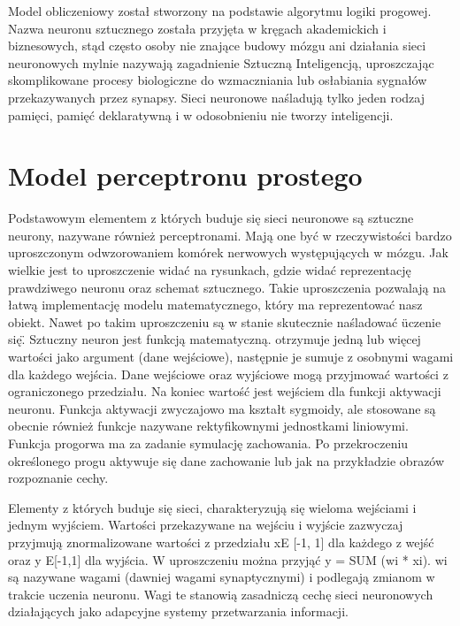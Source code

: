 \documentclass[12pt,a4paper,twoside,titlepage,openright]{book}
\begin{document}
Model obliczeniowy został stworzony na podstawie algorytmu logiki progowej. 
Nazwa neuronu sztucznego została przyjęta w kręgach akademickich i biznesowych, stąd często osoby nie znające budowy mózgu ani działania sieci neuronowych mylnie nazywają zagadnienie Sztuczną Inteligencją, uproszczając skomplikowane procesy biologiczne do wzmaczniania lub osłabiania sygnałów przekazywanych przez synapsy. Sieci neuronowe naśladują tylko jeden rodzaj pamięci, pamięć deklaratywną i w odosobnieniu nie tworzy inteligencji.


\section{Model perceptronu prostego}
Podstawowym elementem z których buduje się sieci neuronowe są sztuczne neurony, nazywane również perceptronami. Mają one być w rzeczywistości bardzo uproszczonym odwzorowaniem komórek nerwowych występujących w mózgu. Jak wielkie jest to uproszczenie widać na rysunkach, gdzie widać reprezentację prawdziwego neuronu  oraz schemat sztucznego. Takie uproszczenia pozwalają na łatwą implementację modelu matematycznego, który ma reprezentować nasz obiekt. Nawet po takim uproszczeniu są w stanie skutecznie naśladować \"uczenie się\". 
Sztuczny neuron jest funkcją matematyczną.  otrzymuje jedną lub więcej wartości jako argument (dane wejściowe), następnie je sumuje z osobnymi wagami dla każdego wejścia. Dane wejściowe oraz wyjściowe mogą przyjmować wartości z ograniczonego przedziału. Na koniec wartość jest wejściem dla funkcji aktywacji neuronu. Funkcja aktywacji zwyczajowo ma kształt sygmoidy, ale stosowane są obecnie również funkcje nazywane rektyfikownymi jednostkami liniowymi. Funkcja progorwa ma za zadanie symulację zachowania. Po przekroczeniu określonego progu aktywuje się dane zachowanie lub jak na przykładzie obrazów rozpoznanie cechy.

Elementy z których buduje się sieci, charakteryzują się wieloma wejściami i jednym wyjściem. Wartości przekazywane na wejściu i wyjście zazwyczaj przyjmują znormalizowane wartości z przedziału xE [-1, 1] dla każdego z wejść oraz y E[-1,1] dla wyjścia. W uproszczeniu można przyjąć y = SUM (wi * xi). wi są nazywane wagami (dawniej wagami synaptycznymi) i podlegają zmianom w trakcie uczenia neuronu. Wagi te stanowią zasadniczą cechę sieci neuronowych działających jako adapcyjne systemy przetwarzania informacji.
\end{document}
